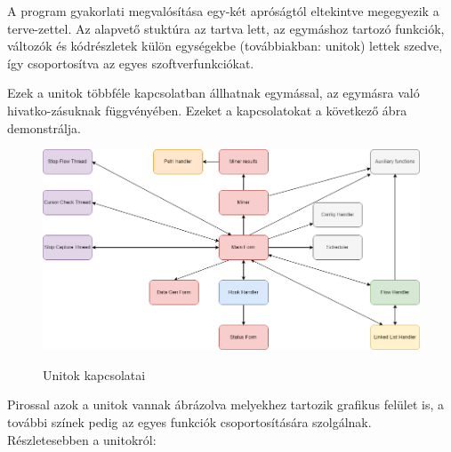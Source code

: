 \lstset{style=delphicode}



A program gyakorlati megvalósítása egy-két apróságtól eltekintve megegyezik a terve\hyp{}zettel. Az alapvető stuktúra az tartva lett, az egymáshoz tartozó funkciók, változók és kódrészletek külön egységekbe (továbbiakban: unitok) lettek szedve, így csoportosítva az egyes szoftverfunkciókat.

Ezek a unitok többféle kapcsolatban állhatnak egymással, az egymásra való hivatko\hyp{}zásuknak függvényében. Ezeket a kapcsolatokat a következő ábra demonstrálja.

\begin{figure}[h]
	\begin{center}
		\caption{Unitok kapcsolatai}
		\includegraphics[width=\textwidth, keepaspectratio=true]{images/unitok_kapcsolati_abra}\\
		\label{fig:example}
	\end{center}
\end{figure}

Pirossal azok a unitok vannak ábrázolva melyekhez tartozik grafikus felület is, a további színek pedig az egyes funkciók csoportosítására szolgálnak. Részletesebben a unitokról:

